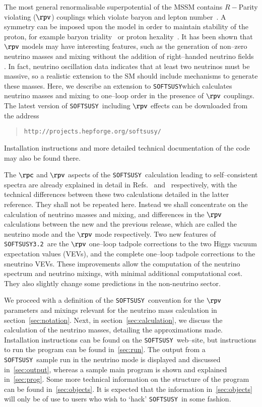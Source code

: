 \documentclass[pdflatex,final,3p,times]{elsarticle}
\def\SOFTSUSY{{\tt SOFTSUSY}}
\begin{document}
The most general renormalisable superpotential of the MSSM contains
$R-$Parity violating ($\rpv$) couplings which violate baryon and lepton
number~\cite{Dreiner:1997uz}. A symmetry can be imposed upon the model
in order to maintain stability of the proton, for example baryon
triality~\cite{Ibanez:1991pr} or proton
hexality~\cite{Dreiner:2007vp}.  It has been shown that $\rpv$ models
may have interesting features, such as the generation of non--zero
neutrino masses and mixing without the addition of right--handed neutrino
fields 
\cite{Hall:1983id}.  In fact, neutrino oscillation data indicates that
at least two neutrinos must be massive, so a realistic extension to
the SM should include mechanisms to generate these masses.  Here, we
describe an extension to \SOFTSUSY\@ which calculates neutrino masses
and mixing to one--loop order in the presence of $\rpv$ couplings.
The latest version of \SOFTSUSY~including $\rpv$ effects can be
downloaded from the address
\begin{quote}
{\tt http://projects.hepforge.org/softsusy/}
\end{quote}
Installation instructions and more detailed technical documentation of the
code may also be found there.

The $\rpc$ and $\rpv$ aspects of the \SOFTSUSY~calculation leading to
self--consistent spectra are already explained in detail in
Refs.~\cite{Allanach:2001kg} and~\cite{Allanach:2009bv} respectively,
with the technical differences between these two calculations detailed
in the latter reference.  They shall not be repeated here.  Instead we shall
concentrate on the 
calculation of neutrino masses and mixing, and differences in the
$\rpv$ calculations between the new and the previous release, which
are called the neutrino mode and the $\rpv$ mode respectively.  
Two new features of {\tt SOFTSUSY3.2}~are the $\rpv$ one--loop tadpole
corrections to the 
two Higgs vacuum expectation values (VEVs), and the complete one--loop
tadpole corrections to the sneutrino VEVs.  
These improvements allow the computation of the neutrino spectrum and neutrino
mixings, with minimal additional computational cost. They also slightly change
some predictions in the non-neutrino sector. 

We proceed with a definition of the \SOFTSUSY~convention for the
$\rpv$ parameters and mixings relevant for the neutrino mass
calculation in section~\ref{sec:notation}. Next, in
section~\ref{sec:calculation}, we discuss the calculation of the
neutrino masses, detailing the approximations made.  Installation
instructions can be found on the \SOFTSUSY~web--site, but instructions
to run the program can be found in~\ref{sec:run}.  The output
from a \SOFTSUSY~sample run in the neutrino mode is displayed and
discussed in~\ref{sec:output}, whereas a sample main program
is shown and explained in~\ref{sec:prog}. Some more technical
information on the structure of the program can be found in~\ref{sec:objects}.
It is expected that the information in~\ref{sec:objects} will only be of use
to users who wish to 
`hack' \SOFTSUSY~in some fashion.
\end{document}
